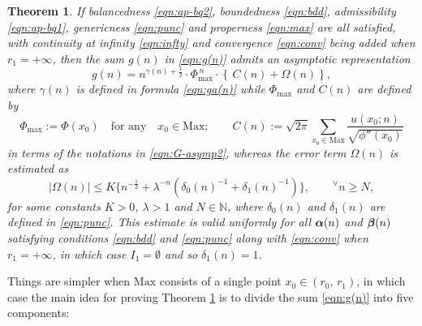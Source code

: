 \documentclass[a4paper,12pt]{article}
\theoremstyle{plain}
\newtheorem{theorem}{Theorem}[section]
\def\N{\mathbb{N}}
\def\bal{\mbox{\boldmath $\alpha$}}
\def\bbeta{\mbox{\boldmath $\beta$}}
\def\Phim{\Phi_{\scriptstyle \mathrm{max}}}
\def\Mm{\mathrm{M{\scriptstyle ax}}}
\begin{document}
\begin{theorem} \label{thm:dspm}  
If balancedness \eqref{eqn:ap-bq2}, boundedness \eqref{eqn:bdd}, 
admissibility \eqref{eqn:ap-bq1}, genericness \eqref{eqn:punc} and properness 
\eqref{eqn:max} are all satisfied, with continuity at infinity \eqref{eqn:infty} 
and convergence \eqref{eqn:conv} being added when $r_1 = + \infty$, then the 
sum $g(n)$ in \eqref{eqn:g(n)} admits an asymptotic representation    
\begin{equation} \label{eqn:dspm}
g(n) = n^{\gamma(n) + \frac{1}{2} } \cdot 
\Phim^{\, n} \cdot \left\{\, C(n)  + \Omega(n)  \right\},     
\end{equation} 
where $\gamma(n)$ is defined in formula \eqref{eqn:ga(n)} while $\Phim$ and 
$C(n)$ are defined by 
\begin{equation} \label{eqn:PhimC}
\Phim := \Phi(x_0) \quad \mbox{for any} \quad x_0 \in \Mm; \qquad 
C(n) := \sqrt{2 \pi } \sum_{x_0 \in \Mm} \dfrac{u( x_0; n)}{ \sqrt{\phi''( x_0 )}}  
\end{equation} 
in terms of the notations in \eqref{eqn:G-asymp2}, whereas the error term 
$\Omega(n)$ is estimated as  
\begin{equation} \label{eqn:uniform}
|\Omega(n)| \le K \{ n^{-\frac{1}{2}} + 
\lambda^{-n} (\delta_0(n)^{-1} + \delta_1(n)^{-1}) \},  
\qquad {}^{\forall} n \ge N,  
\end{equation}
for some constants $K > 0$, $\lambda > 1$ and $N \in \N$, where $\delta_0(n)$ 
and $\delta_1(n)$ are defined in \eqref{eqn:punc}.  
This estimate is valid uniformly for all $\bal(n)$ and $\bbeta(n)$ satisfying 
conditions \eqref{eqn:bdd} and \eqref{eqn:punc} along with 
\eqref{eqn:conv} when $r_1 = +\infty$, in which case $I_1 = \emptyset$ 
and so $\delta_1(n) = 1$.    
\end{theorem} 
\par
Things are simpler when $\Mm$ consists of a single point $x_0 \in (r_0, \, r_1)$,  
in which case the main idea for proving Theorem \ref{thm:dspm} is to divide 
the sum \eqref{eqn:g(n)} into five components: 
\end{document}
